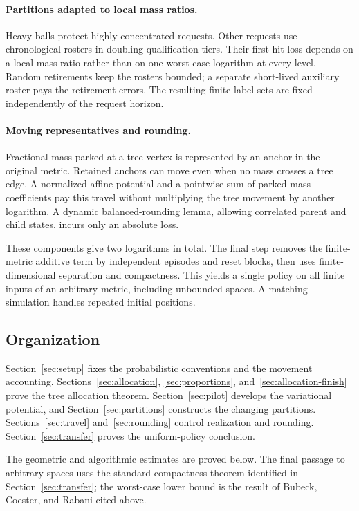 \paragraph{Partitions adapted to local mass ratios.}
Heavy balls protect highly concentrated requests. Other requests
use chronological rosters in doubling qualification tiers.
Their first-hit loss depends on a local mass ratio rather than on
one worst-case logarithm at every level. Random retirements keep
the rosters bounded; a separate short-lived auxiliary roster pays
the retirement errors. The resulting finite label sets are fixed
independently of the request horizon.

\paragraph{Moving representatives and rounding.}
Fractional mass parked at a tree vertex is represented by an anchor
in the original metric. Retained anchors can move even when no mass
crosses a tree edge. A normalized affine potential and a pointwise
sum of parked-mass coefficients pay this travel without multiplying
the tree movement by another logarithm. A dynamic balanced-rounding
lemma, allowing correlated parent and child states, incurs only an
absolute loss.

These components give two logarithms in total. The final step removes
the finite-metric additive term by independent episodes and reset
blocks, then uses finite-dimensional separation and compactness.
This yields a single policy on all finite inputs of an arbitrary
metric, including unbounded spaces. A matching simulation handles
repeated initial positions.

\subsection{Organization}

Section~\ref{sec:setup} fixes the probabilistic conventions and the
movement accounting. Sections~\ref{sec:allocation},
\ref{sec:proportions}, and~\ref{sec:allocation-finish} prove the
tree allocation theorem. Section~\ref{sec:pilot} develops the
variational potential, and Section~\ref{sec:partitions} constructs
the changing partitions. Sections~\ref{sec:travel}
and~\ref{sec:rounding} control realization and rounding.
Section~\ref{sec:transfer} proves the uniform-policy conclusion.

The geometric and algorithmic estimates are proved below.
The final passage to arbitrary spaces uses the standard compactness
theorem identified in Section~\ref{sec:transfer}; the worst-case lower
bound is the result of Bubeck, Coester, and Rabani cited above.
